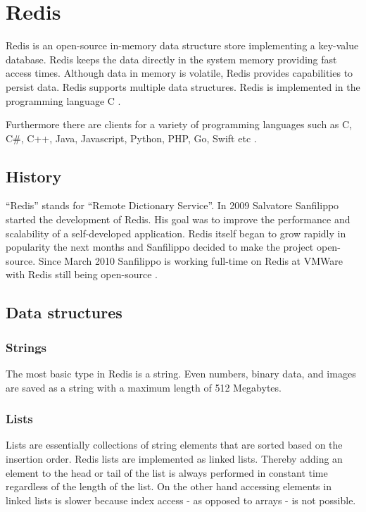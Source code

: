 \chapter{Redis}

Redis is an open-source in-memory data structure store implementing a key-value
database. Redis keeps the data directly in the system memory providing fast
access times. Although data in memory is volatile, Redis provides capabilities
to persist data. Redis supports multiple data structures. Redis is implemented
in the programming language C \cite{introredis}.

Furthermore there are clients for a variety of programming languages such as C,
C\#, C++, Java, Javascript, Python, PHP, Go, Swift etc \cite{clientredis}.

\section{History}
``Redis'' stands for ``Remote Dictionary Service''. In 2009 Salvatore Sanfilippo
started the development of Redis. His goal was to improve the performance and
scalability of a self-developed application. Redis itself began to grow rapidly
in popularity the next months and Sanfilippo decided to make the project
open-source. Since March 2010 Sanfilippo is working full-time on Redis at VMWare
with Redis still being open-source \cite{russoredis,wikiredis}.

\section{Data structures}
\subsection{Strings}
The most basic type in Redis is a string. Even numbers, binary data, and images
are saved as a string with a maximum length of 512 Megabytes.

\subsection{Lists}
Lists are essentially collections of string elements that are sorted based on
the insertion order. Redis lists are implemented as linked lists. Thereby adding
an element to the head or tail of the list is always performed in constant time
regardless of the length of the list. On the other hand accessing elements in
linked lists is slower because index access - as opposed to arrays - is not
possible.


